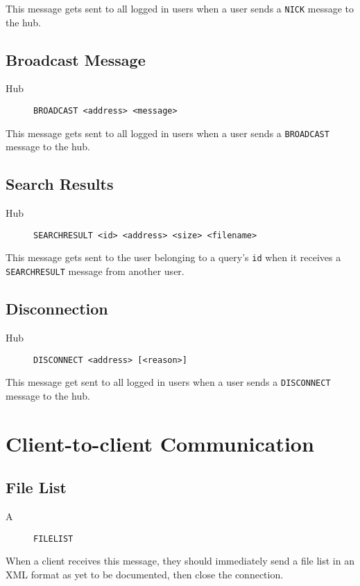 \documentclass{article}
\begin{document}
This message gets sent to all logged in users when a user sends a \verb+NICK+ message to the hub.

\subsection{Broadcast Message}
\begin{description}
\item[Hub] \verb+BROADCAST <address> <message>+
\end{description}

This message gets sent to all logged in users when a user sends a \verb+BROADCAST+ message to the hub.

\subsection{Search Results}
\begin{description}
\item[Hub] \verb+SEARCHRESULT <id> <address> <size> <filename>+
\end{description}

This message gets sent to the user belonging to a query's \verb+id+ when it receives a \verb+SEARCHRESULT+ message from another user.

\subsection{Disconnection}
\begin{description}
\item[Hub] \verb+DISCONNECT <address> [<reason>]+
\end{description}

This message get sent to all logged in users when a user sends a \verb+DISCONNECT+ message to the hub.

\section{Client-to-client Communication}

\subsection{File List}
\begin{description}
\item[A] \verb+FILELIST+
\end{description}

When a client receives this message, they should immediately send a file list in an XML format as yet to be documented, then close the connection.
\end{document}
